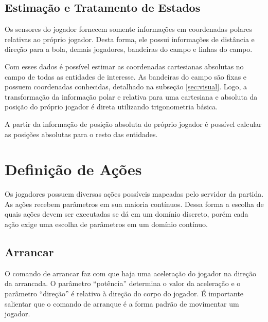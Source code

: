 \subsection{Estimação e Tratamento de Estados}

\par Os sensores do jogador fornecem somente informações em coordenadas polares relativas ao próprio jogador. Desta forma, ele possui informações de distância e direção para a bola, demais jogadores, bandeiras do campo e linhas do campo.

\par Com esses dados é possível estimar as coordenadas cartesianas absolutas no campo de todas as entidades de interesse. As bandeiras do campo são fixas e possuem coordenadas conhecidas, detalhado na subseção \ref{sec:visual}. Logo, a transformação da informação polar e relativa para uma cartesiana e absoluta da posição do próprio jogador é direta utilizando trigonometria básica. 

\par A partir da informação de posição absoluta do próprio jogador é possível calcular as posições absolutas para o resto das entidades.



\section{Definição de Ações}

\par Os jogadores possuem diversas ações possíveis mapeadas pelo servidor da partida. As ações recebem parâmetros em sua maioria contínuos. Dessa forma a escolha de quais ações devem ser executadas se dá em um domínio discreto, porém cada ação exige uma escolha de parâmetros em um domínio contínuo.

\subsection{Arrancar}
\label{sec:dash}

O comando de arrancar faz com que haja uma aceleração do jogador na direção da arrancada. O parâmetro ``potência'' determina o valor da aceleração e o parâmetro ``direção'' é relativo à direção do corpo do jogador. É importante salientar que o comando de arranque é a forma padrão de movimentar um jogador.

